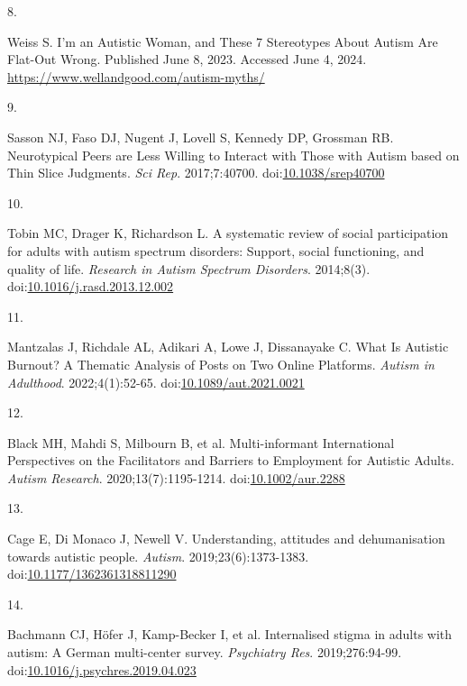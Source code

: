 \documentclass[
  letterpaper,
  DIV=11,
  numbers=noendperiod]{scrreprt}
\newlength{\cslhangindent}
\newlength{\csllabelwidth}
\newenvironment{CSLReferences}[2] %
 {\begin{list}{}{%
  \setlength{\itemindent}{0pt}
  \setlength{\leftmargin}{0pt}
  \setlength{\parsep}{0pt}
  \ifodd #1
   \setlength{\leftmargin}{\cslhangindent}
   \setlength{\itemindent}{-1\cslhangindent}
  \fi
  \setlength{\itemsep}{#2\baselineskip}}}
 {\end{list}}
\newcommand{\CSLLeftMargin}[1]{\parbox[t]{\csllabelwidth}{\strut#1\strut}}
\newcommand{\CSLRightInline}[1]{\parbox[t]{\linewidth - \csllabelwidth}{\strut#1\strut}}
\begin{document}
\begin{CSLReferences}{0}{1}
\CSLLeftMargin{8. }%
\CSLRightInline{Weiss S. I'm an {Autistic Woman}, and {These} 7
{Stereotypes About Autism Are Flat-Out Wrong}. Published June 8, 2023.
Accessed June 4, 2024. \url{https://www.wellandgood.com/autism-myths/}}

\CSLLeftMargin{9. }%
\CSLRightInline{Sasson NJ, Faso DJ, Nugent J, Lovell S, Kennedy DP,
Grossman RB. Neurotypical {Peers} are {Less Willing} to {Interact} with
{Those} with {Autism} based on {Thin Slice Judgments}. \emph{Sci Rep}.
2017;7:40700.
doi:\href{https://doi.org/10.1038/srep40700}{10.1038/srep40700}}

\CSLLeftMargin{10. }%
\CSLRightInline{Tobin MC, Drager K, Richardson L. A systematic review of
social participation for adults with autism spectrum disorders:
{Support}, social functioning, and quality of life. \emph{Research in
Autism Spectrum Disorders}. 2014;8(3).
doi:\href{https://doi.org/10.1016/j.rasd.2013.12.002}{10.1016/j.rasd.2013.12.002}}

\CSLLeftMargin{11. }%
\CSLRightInline{Mantzalas J, Richdale AL, Adikari A, Lowe J, Dissanayake
C. What {Is Autistic Burnout}? {A Thematic Analysis} of {Posts} on {Two
Online Platforms}. \emph{Autism in Adulthood}. 2022;4(1):52-65.
doi:\href{https://doi.org/10.1089/aut.2021.0021}{10.1089/aut.2021.0021}}

\CSLLeftMargin{12. }%
\CSLRightInline{Black MH, Mahdi S, Milbourn B, et al. Multi-informant
{International Perspectives} on the {Facilitators} and {Barriers} to
{Employment} for {Autistic Adults}. \emph{Autism Research}.
2020;13(7):1195-1214.
doi:\href{https://doi.org/10.1002/aur.2288}{10.1002/aur.2288}}

\CSLLeftMargin{13. }%
\CSLRightInline{Cage E, Di Monaco J, Newell V. Understanding, attitudes
and dehumanisation towards autistic people. \emph{Autism}.
2019;23(6):1373-1383.
doi:\href{https://doi.org/10.1177/1362361318811290}{10.1177/1362361318811290}}

\CSLLeftMargin{14. }%
\CSLRightInline{Bachmann CJ, Höfer J, Kamp-Becker I, et al. Internalised
stigma in adults with autism: {A German} multi-center survey.
\emph{Psychiatry Res}. 2019;276:94-99.
doi:\href{https://doi.org/10.1016/j.psychres.2019.04.023}{10.1016/j.psychres.2019.04.023}}


\end{CSLReferences}
\end{document}
